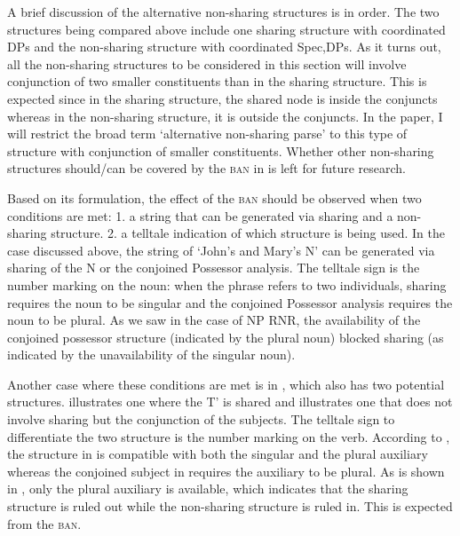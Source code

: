 \documentclass[output=paper]{langscibook}
\begin{document}
A brief discussion of the alternative non-sharing structures is in order. The two structures being compared above include one sharing structure with coordinated DPs and the non-sharing structure with coordinated Spec,DPs. As it turns out, all the non-sharing structures to be considered in this section will involve conjunction of two smaller constituents than in the sharing structure. This is expected since in the sharing structure, the shared node is inside the conjuncts whereas in the non-sharing structure, it is outside the conjuncts. In the paper, I will restrict the broad term `alternative non-sharing parse' to this type of structure with conjunction of smaller constituents. Whether other non-sharing structures should/can be covered by the \textsc{ban} in  is left for future research.

Based on its formulation, the effect of the \textsc{ban} should be observed when two conditions are met: 1. a string that can be generated via sharing and a non-sharing structure. 2. a telltale indication of which structure is being used. In the case discussed above, the string of `John's and Mary's N' can be generated via sharing of the N or the conjoined Possessor analysis. The telltale sign is the number marking on the noun: when the phrase refers to two individuals, sharing requires the noun to be singular and the conjoined Possessor analysis requires the noun to be plural. As we saw in the case of NP RNR, the availability of the conjoined possessor structure (indicated by the plural noun) blocked sharing (as indicated by the unavailability of the singular noun).

Another case where these conditions are met is in , which also has two potential structures.  illustrates one where the T' is shared and  illustrates one that does not involve sharing but the conjunction of the subjects. The telltale sign to differentiate the two structure is the number marking on the verb. According to \citet{Kluck:2009, Grosz:2015, Shen:2019}, the structure in  is compatible with both the singular and the plural auxiliary whereas the conjoined subject in  requires the auxiliary to be plural. As is shown in , only the plural auxiliary is available, which indicates that the sharing structure  is ruled out while the non-sharing structure  is ruled in. This is expected from the \textsc{ban}.
\end{document}
